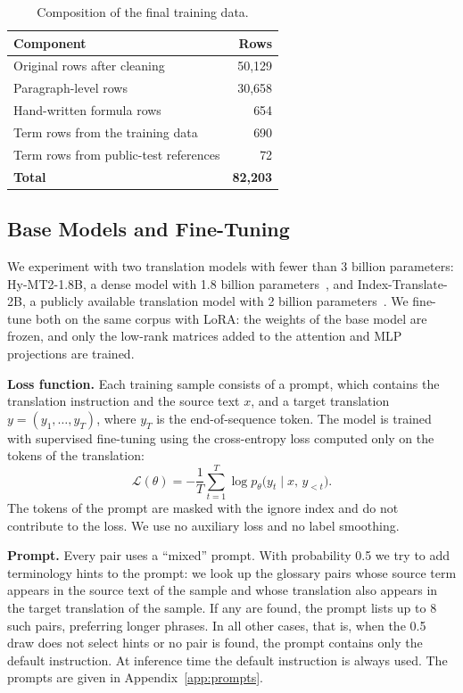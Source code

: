 \documentclass[conference]{IEEEtran}
\begin{document}
\begin{table}[t]
\caption{Composition of the final training data.}
\label{tab:composition}
\centering
\begin{tabular}{lr}
\toprule
Component & Rows \\
\midrule
Original rows after cleaning & 50,129 \\
Paragraph-level rows & 30,658 \\
Hand-written formula rows & 654 \\
Term rows from the training data & 690 \\
Term rows from public-test references & 72 \\
\midrule
\textbf{Total} & \textbf{82,203} \\
\bottomrule
\end{tabular}
\end{table}

\subsection{Base Models and Fine-Tuning}\label{sec:finetune}
We experiment with two translation models with fewer than 3 billion parameters: Hy-MT2-1.8B, a dense model with 1.8 billion parameters~\cite{zheng2026hymt2}, and Index-Translate-2B, a publicly available translation model with 2 billion parameters~\cite{indexteam}. We fine-tune both on the same corpus with LoRA: the weights of the base model are frozen, and only the low-rank matrices added to the attention and MLP projections are trained.

\textbf{Loss function.} Each training sample consists of a prompt, which contains the translation instruction and the source text $x$, and a target translation $y=(y_1,\dots,y_T)$, where $y_T$ is the end-of-sequence token. The model is trained with supervised fine-tuning using the cross-entropy loss computed only on the tokens of the translation:
\begin{equation}
\mathcal{L}(\theta) = -\frac{1}{T}\sum_{t=1}^{T} \log p_\theta\big(y_t \mid x,\, y_{<t}\big).
\label{eq:loss}
\end{equation}
The tokens of the prompt are masked with the ignore index and do not contribute to the loss. We use no auxiliary loss and no label smoothing.

\textbf{Prompt.} Every pair uses a ``mixed'' prompt. With probability 0.5 we try to add terminology hints to the prompt: we look up the glossary pairs whose source term appears in the source text of the sample and whose translation also appears in the target translation of the sample. If any are found, the prompt lists up to 8 such pairs, preferring longer phrases. In all other cases, that is, when the 0.5 draw does not select hints or no pair is found, the prompt contains only the default instruction. At inference time the default instruction is always used. The prompts are given in Appendix~\ref{app:prompts}.
\end{document}
